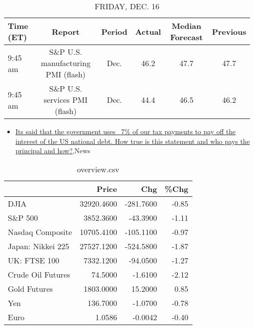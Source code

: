 \documentclass{article}%
\begin{document}
%


\begin{table}[htbp]%
\caption{FRIDAY, DEC. 16}%
\centering%
\begin{adjustbox}{width=1\textwidth}%
\begin{tabular}{lccccc}
\toprule
Time (ET) &                             Report & Period & Actual & Median Forecast & Previous \\
\midrule
  9:45 am & S\&P U.S. manufacturing PMI (flash) &   Dec. &   46.2 &            47.7 &     47.7 \\
  9:45 am &      S\&P U.S. services PMI (flash) &   Dec. &   44.4 &            46.5 &     46.2 \\
\bottomrule
\end{tabular}
%
\end{adjustbox}%
\end{table}

%
\begin{itemize}%
\item%
\href{https://reddit.com/r/Economics/comments/znzzj8/its\_said\_that\_the\_government\_uses\_7\_of\_our\_tax/}{Its said that the government uses ~7\% of our tax payments to pay off the interest of the US national debt. How true is this statement and who pays the principal and how?},News%
\end{itemize}%


\begin{table}[htbp]%
\caption{overview.csv}%
\centering%
\begin{adjustbox}{width=1\textwidth}%
\begin{tabular}{lrrr}
\toprule
                  &      Price &       Chg &  \%Chg \\
\midrule
             DJIA & 32920.4600 & -281.7600 & -0.85 \\
          S\&P 500 &  3852.3600 &  -43.3900 & -1.11 \\
 Nasdaq Composite & 10705.4100 & -105.1100 & -0.97 \\
Japan: Nikkei 225 & 27527.1200 & -524.5800 & -1.87 \\
     UK: FTSE 100 &  7332.1200 &  -94.0500 & -1.27 \\
Crude Oil Futures &    74.5000 &   -1.6100 & -2.12 \\
     Gold Futures &  1803.0000 &   15.2000 &  0.85 \\
              Yen &   136.7000 &   -1.0700 & -0.78 \\
             Euro &     1.0586 &   -0.0042 & -0.40 \\
\bottomrule
\end{tabular}
%
\end{adjustbox}%
\end{table}
\end{document}
